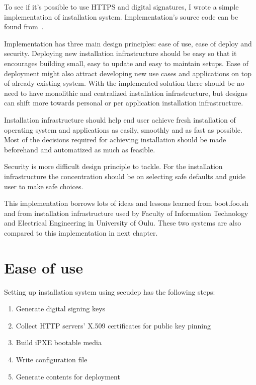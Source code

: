 
To see if it's possible to use HTTPS and digital signatures, I wrote a
simple implementation of installation system. Implementation's source
code can be found from~\cite{secudep}.

Implementation has three main design principles: ease of use, ease of
deploy and security. Deploying new installation infrastructure should
be easy so that it encourages building small, easy to update and easy
to maintain setups. Ease of deployment might also attract developing
new use cases and applications on top of already existing system. With
the implemented solution there should be no need to have monolithic
and centralized installation infrastructure, but designs can shift
more towards personal or per application installation infrastructure.

Installation infrastructure should help end user achieve fresh
installation of operating system and applications as easily, smoothly
and as fast as possible. Most of the decisions required for achieving
installation should be made beforehand and automatized as much as
feasible.

Security is more difficult design principle to tackle. For the
installation infrastructure the concentration should be on selecting
safe defaults and guide user to make safe choices.

This implementation borrows lots of ideas and lessons learned from
boot.foo.sh\cite{boot-foo-sh} and from installation infrastructure
used by Faculty of Information Technology and Electrical Engineering
in University of Oulu. These two systems are also compared to this
implementation in next chapter.

\section{Ease of use}

Setting up installation system using secudep has the following steps:

\begin{enumerate}
  \item Generate digital signing keys
  \item Collect HTTP servers' X.509 certificates for public key pinning
  \item Build iPXE bootable media
  \item Write configuration file
  \item Generate contents for deployment
\end{enumerate}

